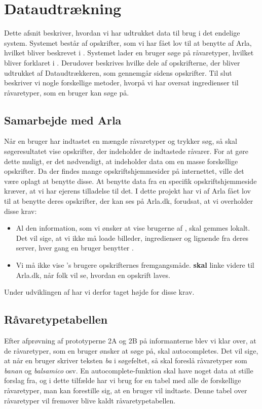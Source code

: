 \section{Dataudtrækning}
Dette afsnit beskriver, hvordan vi har udtrukket data til brug i det endelige system. Systemet består af opskrifter, som vi har fået lov til at benytte af Arla, hvilket bliver beskrevet i . Systemet lader en bruger søge på råvaretyper, hvilket bliver forklaret i . Derudover beskrives hvilke dele af opskrifterne, der bliver udtrukket af Dataudtrækkeren, som gennemgår sidens opskrifter. Til slut beskriver vi nogle forskellige metoder, hvorpå vi har oversat ingredienser til råvaretyper, som en bruger kan søge på.

\subsection{Samarbejde med Arla}
\label{sec:samarla}
Når en bruger har indtastet en mængde råvaretyper og trykker søg, så skal søgeresultatet vise opskrifter, der indeholder de indtastede råvarer. For at gøre dette muligt, er det nødvendigt, at \Foodl{} indeholder data om en masse forskellige opskrifter. Da der findes mange opskriftshjemmesider på internettet, ville det være oplagt at benytte disse. At benytte data fra en specifik opskriftshjemmeside kræver, at vi har ejerens tilladelse til det. I dette projekt har vi af Arla fået lov til at benytte deres opskrifter, der kan ses på Arla.dk, forudsat, at vi overholder disse krav:

\begin{itemize} [noitemsep]
  \item Al den information, som vi ønsker at vise brugerne af \Foodl, skal gemmes lokalt. Det vil sige, at vi ikke må loade billeder, ingredienser og lignende fra deres server, hver gang en bruger benytter \Foodl.
  \item Vi må ikke vise \Foodl{}'s brugere opskrifternes fremgangsmåde. \Foodl{} \textbf{skal} linke videre til Arla.dk, når folk vil se, hvordan en opskrift laves.
\end{itemize}
Under udviklingen af \Foodl{} har vi derfor taget højde for disse krav.

\subsection{Råvaretypetabellen}
\label{sec:raavare}
Efter afprøvning af prototyperne 2A og 2B på informanterne blev vi klar over, at de råvaretyper, som en bruger ønsker at søge på, skal autocompletes. Det vil sige, at når en bruger skriver teksten \textit{ba} i søgefeltet, så skal \Foodl{} foreslå råvaretyper som \fx \textit{banan} og \textit{balsamico} osv. En autocomplete-funktion skal have noget data at stille forslag fra, og i dette tilfælde har vi brug for en tabel med alle de forskellige råvaretyper, man kan forestille sig, at en bruger vil indtaste. Denne tabel over råvaretyper vil fremover blive kaldt råvaretypetabellen.

